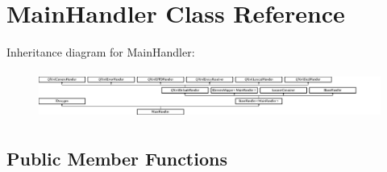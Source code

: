 \hypertarget{class_main_handler}{}\section{Main\+Handler Class Reference}
\label{class_main_handler}
Inheritance diagram for Main\+Handler\+:\begin{figure}[H]
\begin{center}
\leavevmode
\includegraphics[height=1.560976cm]{class_main_handler}
\end{center}
\end{figure}
\subsection*{Public Member Functions}
